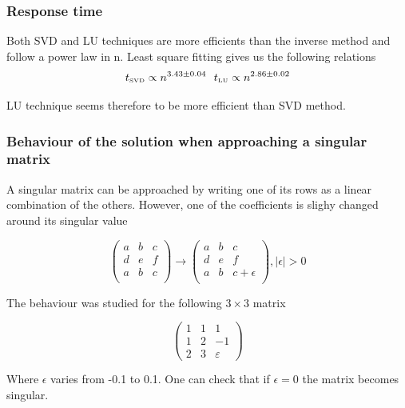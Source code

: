 \documentclass[10 pt]{article}
\begin{document}
\begin{multicols}{2}

\subsubsection{Response time}
Both SVD and LU techniques are more efficients than the inverse method and follow a power law in n. Least square fitting gives us the following relations
\begin{equation}
t_{\text{\tiny SVD}} \propto n^{3.43 \pm 0.04}  \    \ t_{\text{\tiny LU}} \propto n^{2.86 \pm 0.02}
\end{equation}

LU technique seems therefore to be more efficient than SVD method.


\subsubsection{Behaviour of the solution when approaching a singular matrix}
A singular matrix can be approached by writing one of its rows as a linear combination of the others. However, one of the coefficients is slighy changed around its singular value

\begin{equation}
\begin{pmatrix}
a & b & c \\
d & e & f\\
a & b & c\\
\end{pmatrix}
\longrightarrow
\begin{pmatrix}
a & b & c \\
d & e & f\\
a & b & c+\epsilon \\
\end{pmatrix}
, |\epsilon | > 0
\end{equation}

The behaviour was studied for the following $3 \times 3$ matrix

\begin{equation}
\begin{pmatrix}
1 & 1 & 1\\
1 & 2 & -1\\
2 & 3 & \varepsilon
\end{pmatrix}
\end{equation}

Where $\epsilon$ varies from -0.1 to 0.1. One can check that if $\epsilon = 0$ the matrix becomes singular. 

\end{multicols}
\end{document}

